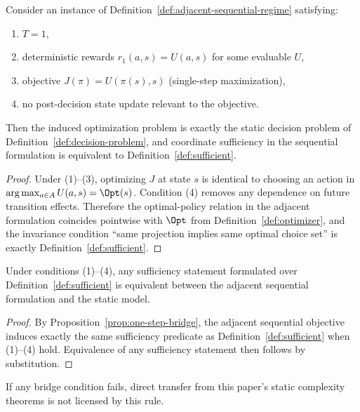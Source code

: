 \begin{proposition}\label{prop:one-step-bridge}
Consider an instance of Definition~\ref{def:adjacent-sequential-regime} satisfying:
\begin{enumerate}
\item $T=1$,
\item deterministic rewards $r_1(a,s)=U(a,s)$ for some evaluable $U$,
\item objective $J(\pi)=U(\pi(s),s)$ (single-step maximization),
\item no post-decision state update relevant to the objective.
\end{enumerate}
Then the induced optimization problem is exactly the static decision problem of Definition~\ref{def:decision-problem}, and coordinate sufficiency in the sequential formulation is equivalent to Definition~\ref{def:sufficient}.
\end{proposition}

\begin{proof}
Under (1)--(3), optimizing $J$ at state $s$ is identical to choosing an action in $\arg\max_{a\in A} U(a,s)=\Opt(s)$. Condition (4) removes any dependence on future transition effects. Therefore the optimal-policy relation in the adjacent formulation coincides pointwise with $\Opt$ from Definition~\ref{def:optimizer}, and the invariance condition ``same projection implies same optimal choice set'' is exactly Definition~\ref{def:sufficient}.
\end{proof}

\begin{proposition}\label{prop:bridge-transfer-scope}
Under conditions (1)--(4), any sufficiency statement formulated over Definition~\ref{def:sufficient} is equivalent between the adjacent sequential formulation and the static model.
\end{proposition}

\begin{proof}
By Proposition~\ref{prop:one-step-bridge}, the adjacent sequential objective induces exactly the same sufficiency predicate as Definition~\ref{def:sufficient} when (1)--(4) hold. Equivalence of any sufficiency statement then follows by substitution.
\end{proof}

If any bridge condition fails, direct transfer from this paper's static complexity theorems is not licensed by this rule.

